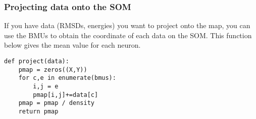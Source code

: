 \begin{frame}[fragile]
    \frametitle{Projecting data onto the SOM}
    If you have data (RMSDs, energies) you want to project onto the map, you can use the BMUs to obtain the coordinate of each data on the SOM. This function below gives the mean value for each neuron.
    \begin{lstlisting}
def project(data):
    pmap = zeros((X,Y))
    for c,e in enumerate(bmus):
        i,j = e
        pmap[i,j]+=data[c]
    pmap = pmap / density
    return pmap
    \end{lstlisting}
\end{frame}
